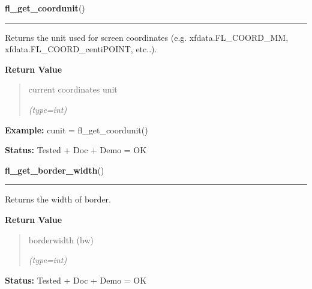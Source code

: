     \label{xformslib:flbasic:fl_get_coordunit}

    \vspace{0.5ex}

\hspace{.8\funcindent}\begin{boxedminipage}{\funcwidth}

    \raggedright \textbf{fl\_get\_coordunit}()

    \vspace{-1.5ex}

    \rule{\textwidth}{0.5\fboxrule}
\setlength{\parskip}{2ex}
    Returns the unit used for screen coordinates (e.g. 
    xfdata.FL\_COORD\_MM, xfdata.FL\_COORD\_centiPOINT, etc..).

\setlength{\parskip}{1ex}
      \textbf{Return Value}
    \vspace{-1ex}

      \begin{quote}
      current coordinates unit

      {\it (type=int)}

      \end{quote}

\textbf{Example:} cunit = fl\_get\_coordunit()



\textbf{Status:} Tested + Doc + Demo = OK



    \end{boxedminipage}

    \label{xformslib:flbasic:fl_get_border_width}

    \vspace{0.5ex}

\hspace{.8\funcindent}\begin{boxedminipage}{\funcwidth}

    \raggedright \textbf{fl\_get\_border\_width}()

    \vspace{-1.5ex}

    \rule{\textwidth}{0.5\fboxrule}
\setlength{\parskip}{2ex}
    Returns the width of border.

\setlength{\parskip}{1ex}
      \textbf{Return Value}
    \vspace{-1ex}

      \begin{quote}
      borderwidth (bw)

      {\it (type=int)}

      \end{quote}

\textbf{Status:} Tested + Doc + Demo = OK



    \end{boxedminipage}

